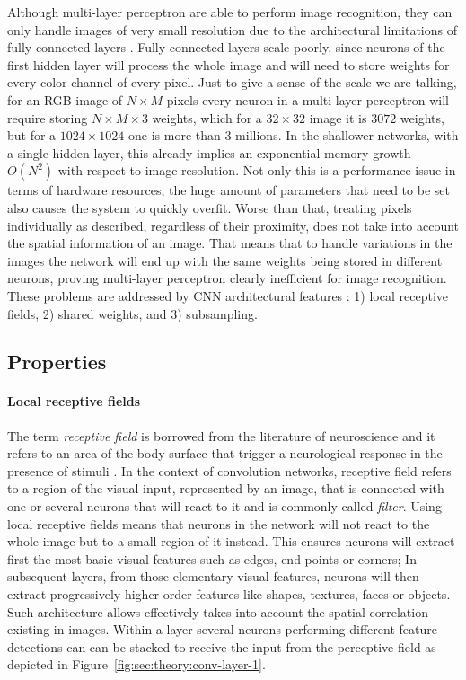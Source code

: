 Although multi-layer perceptron are able to perform image recognition, they can only handle images of very small resolution due to the architectural limitations of fully connected layers \cite{ZHANG1999}.
Fully connected layers scale poorly, since neurons of the first hidden layer will process the whole image and will need to store weights for every color channel of every pixel.
Just to give a sense of the scale we are talking, for an RGB image of ${N}\times{M}$ pixels every neuron in a multi-layer perceptron will require storing ${N}\times{M}\times{3}$ weights, which for a ${32}\times{32}$ image it is $3072$ weights, but for a ${1024}\times{1024}$ one is more than $3$ millions.
In the shallower networks, with a single hidden layer, this already implies an exponential memory growth $O(N^2)$ with respect to image resolution.
Not only this is a performance issue in terms of hardware resources, the huge amount of parameters that need to be set also causes the system to quickly overfit.
Worse than that, treating pixels individually as described, regardless of their proximity, does not take into account the spatial information of an image.
That means that to handle variations in the images the network will end up with the same weights being stored in different neurons, proving multi-layer perceptron clearly inefficient for image recognition.
These problems are addressed by CNN architectural features \cite{LeCun1998}: 1) local receptive fields, 2) shared weights, and 3) subsampling.


\subsection{Properties}
\label{sub:concepts:convnets:properties}

\paragraph{Local receptive fields}
The term \emph{receptive field} is borrowed from the literature of neuroscience and it refers to an area of the body surface that trigger a neurological response in the presence of stimuli \cite{Sherrington1906,Alonso2008}.
In the context of convolution networks, receptive field refers to a region of the visual input, represented by an image, that is connected with one or several neurons that will react to it and is commonly called \emph{filter}.
Using local receptive fields means that neurons in the network will not react to the whole image but to a small region of it instead.
This ensures neurons will extract first the most basic visual features such as edges, end-points or corners;
In subsequent layers, from those elementary visual features, neurons will then extract progressively higher-order features like shapes, textures, faces or objects.
Such architecture allows effectively takes into account the spatial correlation existing in images.
Within a layer several neurons performing different feature detections can can be stacked to receive the input from the perceptive field as depicted in Figure~\ref{fig:sec:theory:conv-layer-1}.

